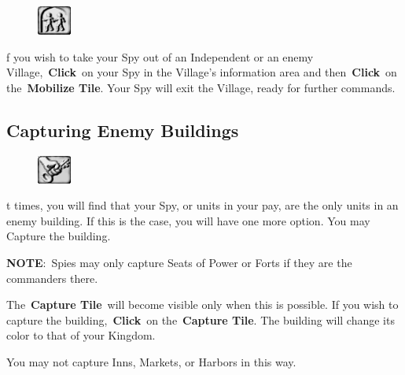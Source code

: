 \begin{figure}
	\vspace{-20pt}
	\begin{center}
		\includegraphics[width=0.1\textwidth]{Tmobilize}
	\end{center}
	\vspace{-20pt}
\end{figure}

f you wish to take your Spy out of an Independent or an enemy Village, \textbf{Click} on your Spy in the Village’s information area and then \textbf{Click} on the \textbf{Mobilize Tile}. Your Spy will exit the Village, ready for further commands.

\subsection{Capturing Enemy Buildings}


\begin{figure}
	\vspace{-20pt}
	\begin{center}
		\includegraphics[width=0.1\textwidth]{Tcapture}
	\end{center}
	\vspace{-20pt}
\end{figure}

t times, you will find that your Spy, or units in your pay, are the only units in an enemy building. If this is the case, you will have one more option. You may Capture the building.

\textbf{NOTE}: Spies may only capture Seats of Power or Forts if they are the commanders there.

The \textbf{Capture Tile} will become visible only when this is possible. If you wish to capture the building, \textbf{Click} on the \textbf{Capture Tile}. The building will change its color to that of your Kingdom.

You may not capture Inns, Markets, or Harbors in this way.

